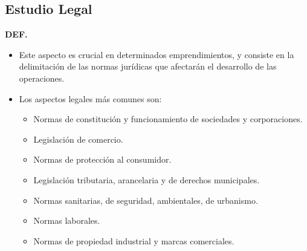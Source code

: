 \documentclass{templateNote}
\begin{document}
\newpage
\subsection{Estudio Legal}\hypertarget{EL}{}
\textbf{DEF.}
\begin{itemize}
  \item Este aspecto es crucial en determinados emprendimientos, y consiste en la delimitación de las normas jurídicas que afectarán el desarrollo de las operaciones.
  \item Los aspectos legales más comunes son:
  \begin{itemize}
    \item Normas de constitución y funcionamiento de sociedades y corporaciones.
    \item Legislación de comercio.
    \item Normas de protección al consumidor.
    \item Legislación tributaria, arancelaria y de derechos municipales.
    \item Normas sanitarias, de seguridad, ambientales, de urbanismo.
    \item Normas laborales.
    \item Normas de propiedad industrial y marcas comerciales.
  \end{itemize}
\end{itemize}

\newpage
\end{document}
